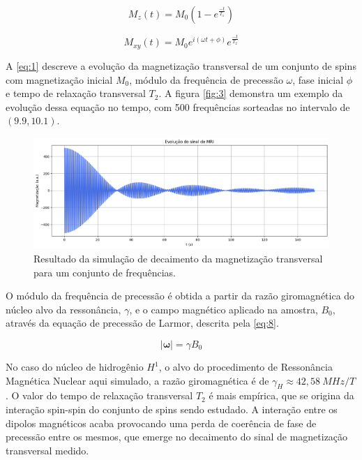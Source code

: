 \documentclass[12pt]{article}
\begin{document}
\begin{equation} \label{eq:7}
    M_z(t) = M_0 (1 - e^{\frac{-t}{T_1}})
\end{equation}

\begin{equation} \label{eq:1}
    M_{xy}(t) = M_0 e^{i(\omega t + \phi)} e^{\frac{-t}{T_2}}
\end{equation}

A \autoref{eq:1} descreve a evolução da magnetização transversal de um conjunto de spins com magnetização inicial $M_0$, módulo da frequência de precessão $\omega$, fase inicial $\phi$ e tempo 
de relaxação transversal $T_2$. A figura \autoref{fig:3} demonstra um exemplo da evolução dessa equação no tempo, com 500 frequências sorteadas no intervalo de $(9.9, 10.1)$.  

\begin{figure} [H]
    \includegraphics[scale=0.28]{sinal_simulado.png}
    \centering
    \caption{Resultado da simulação de decaimento da magnetização transversal para um conjunto de frequências.}
    \label{fig:3}
\end{figure}

O módulo da frequência de precessão é obtida a partir da razão giromagnética do núcleo alvo da ressonância, $\gamma$, e o campo magnético aplicado na amostra, $B_0$, através 
da equação de precessão de Larmor, descrita pela \autoref{eq:8}.

\begin{equation} \label{eq:8}
    |\mathbf{\omega}| = \gamma B_0
\end{equation}

No caso do núcleo de hidrogênio $H^1$, o alvo do procedimento de Ressonância Magnética Nuclear aqui simulado, a razão giromagnética é de $\gamma_H \approx 42,58 \ MHz/T$. O valor do tempo de relaxação transversal $T_2$ é 
mais empírica, que se origina da interação spin-spin do conjunto de spins sendo estudado. A interação entre os dipolos magnéticos acaba provocando uma perda de coerência de fase de precessão entre os mesmos, 
que emerge no decaimento do sinal de magnetização transversal medido.
\end{document}
